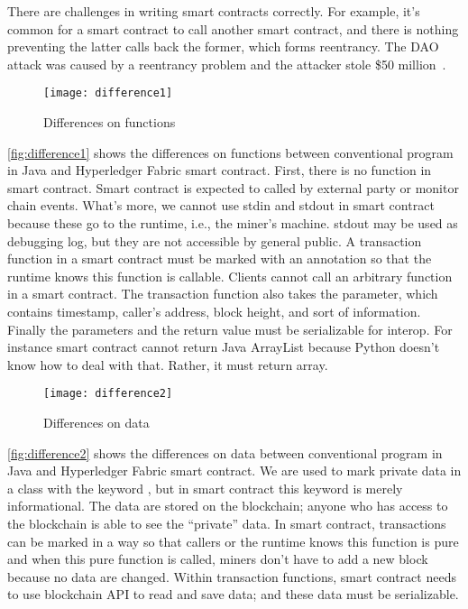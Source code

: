There are challenges in writing smart contracts correctly.
For example, it's common for a smart contract to call another smart contract, and there is nothing preventing the latter calls back the former, which forms reentrancy.
The DAO attack was caused by a reentrancy problem and the attacker stole \$50 million~\cite{dao-attack}.


\begin{figure}[ht]
\centering
\texttt{[image: difference1]}
\caption{Differences on functions}
\label{fig:difference1}
\end{figure}

\autoref{fig:difference1} shows the differences on functions between conventional program in Java and Hyperledger Fabric smart contract.
First, there is no  function in smart contract. Smart contract is expected to called by external party or monitor chain events.
What's more, we cannot use stdin and stdout in smart contract because these go to the runtime, i.e., the miner's machine.
stdout may be used as debugging log, but they are not accessible by general public.
A transaction function in a smart contract must be marked with an annotation so that the runtime knows this function is callable.
Clients cannot call an arbitrary function in a smart contract.
The transaction function also takes the  parameter, which contains timestamp, caller's address, block height, and sort of information.
Finally the parameters and the return value must be serializable for interop.
For instance smart contract cannot return Java ArrayList because Python doesn't know how to deal with that. Rather, it must return array.

\begin{figure}[ht]
\centering
\texttt{[image: difference2]}
\caption{Differences on data}
\label{fig:difference2}
\end{figure}

\autoref{fig:difference2} shows the differences on data between conventional program in Java and Hyperledger Fabric smart contract.
We are used to mark private data in a class with the keyword , but in smart contract this keyword is merely informational.
The data are stored on the blockchain; anyone who has access to the blockchain is able to see the ``private'' data.
In smart contract, transactions can be marked in a way so that callers or the runtime knows this function is pure and when this pure function is called, miners don't have to add a new block because no data are changed.
Within transaction functions, smart contract needs to use blockchain API to read and save data; and these data must be serializable.

